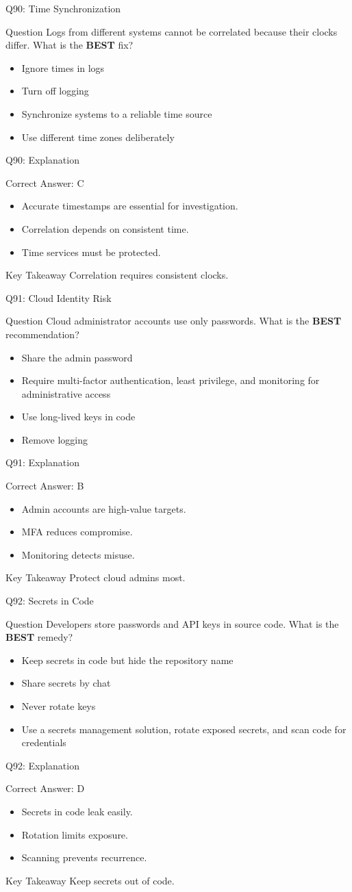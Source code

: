 \documentclass[aspectratio=169]{beamer}
\newcommand{\hq}[7]{%
	\begin{frame}{Q#1: #2}
		\begin{block}{Question}
			#3
		\end{block}
		\begin{itemize}
			#4
		\end{itemize}
	\end{frame}
	\begin{frame}{Q#1: Explanation}
		\begin{block}{Correct Answer: #5}
			\begin{itemize}
				#6
			\end{itemize}
		\end{block}
		\begin{alertblock}{Key Takeaway}
			#7
		\end{alertblock}
	\end{frame}
}
\begin{document}
	\hq{90}{Time Synchronization}
	{Logs from different systems cannot be correlated because their clocks differ. What is the \textbf{BEST} fix?}
	{\item[\textbf{(A)}] Ignore times in logs
		\item[\textbf{(B)}] Turn off logging
		\item[\textbf{(C)}] Synchronize systems to a reliable time source
		\item[\textbf{(D)}] Use different time zones deliberately}
	{C}
	{\item Accurate timestamps are essential for investigation.
		\item Correlation depends on consistent time.
		\item Time services must be protected.}
	{Correlation requires consistent clocks.}
	
	\hq{91}{Cloud Identity Risk}
	{Cloud administrator accounts use only passwords. What is the \textbf{BEST} recommendation?}
	{\item[\textbf{(A)}] Share the admin password
		\item[\textbf{(B)}] Require multi-factor authentication, least privilege, and monitoring for administrative access
		\item[\textbf{(C)}] Use long-lived keys in code
		\item[\textbf{(D)}] Remove logging}
	{B}
	{\item Admin accounts are high-value targets.
		\item MFA reduces compromise.
		\item Monitoring detects misuse.}
	{Protect cloud admins most.}
	
	\hq{92}{Secrets in Code}
	{Developers store passwords and API keys in source code. What is the \textbf{BEST} remedy?}
	{\item[\textbf{(A)}] Keep secrets in code but hide the repository name
		\item[\textbf{(B)}] Share secrets by chat
		\item[\textbf{(C)}] Never rotate keys
		\item[\textbf{(D)}] Use a secrets management solution, rotate exposed secrets, and scan code for credentials}
	{D}
	{\item Secrets in code leak easily.
		\item Rotation limits exposure.
		\item Scanning prevents recurrence.}
	{Keep secrets out of code.}
	
\end{document}
